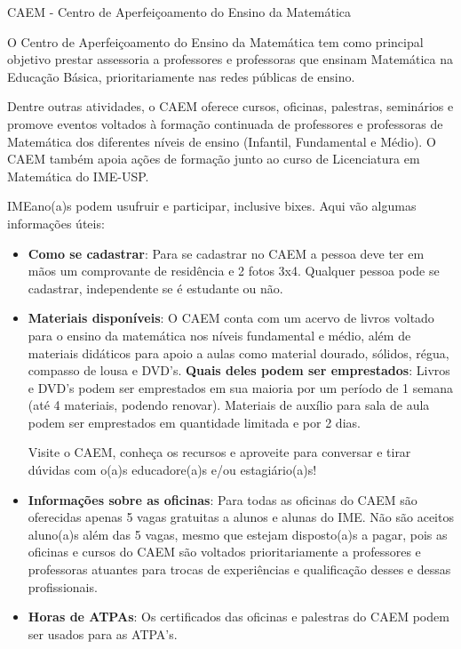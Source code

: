 \begin{secao}{CAEM - Centro de Aperfeiçoamento do Ensino da Matemática}

O Centro de Aperfeiçoamento do Ensino da Matemática tem como principal
objetivo prestar assessoria a professores e professoras que ensinam
Matemática na Educação Básica, prioritariamente nas redes públicas de
ensino.

Dentre outras atividades, o CAEM oferece cursos, oficinas, palestras,
seminários e promove eventos voltados à formação continuada de
professores e professoras de Matemática dos diferentes níveis de ensino
(Infantil, Fundamental e Médio). O CAEM também apoia ações de formação
junto ao curso de Licenciatura em Matemática do IME-USP.

IMEano(a)s podem usufruir e participar, inclusive bixes. Aqui vão algumas
informações úteis:

\begin{itemize}

\item \textbf{Como se cadastrar}: Para se cadastrar no CAEM a pessoa
  deve ter em mãos um comprovante de residência e 2 fotos
  3x4. Qualquer pessoa pode se cadastrar, independente se é estudante ou
  não.

\item \textbf{Materiais disponíveis}: O CAEM conta com um acervo de livros
  voltado para o ensino da matemática nos níveis fundamental e médio,
  além de materiais didáticos para apoio a aulas como material dourado,
  sólidos, régua, compasso de lousa e DVD's. \textbf{Quais deles podem
    ser emprestados}: Livros e DVD's podem ser emprestados em sua
  maioria por um período de 1 semana (até 4 materiais, podendo
  renovar). Materiais de auxílio para sala de aula podem ser emprestados em
  quantidade limitada e por 2 dias. 
  
  Visite o CAEM, conheça os recursos e aproveite para conversar e
  tirar dúvidas com o(a)s educadore(a)s e/ou estagiário(a)s!   

\item \textbf{Informações sobre as oficinas}: Para todas as oficinas
  do CAEM são oferecidas apenas 5 vagas gratuitas a alunos e alunas do IME. Não
  são aceitos aluno(a)s além das 5 vagas, mesmo que estejam disposto(a)s a
  pagar, pois as oficinas e cursos do CAEM são voltados prioritariamente a
  professores e professoras atuantes para trocas de experiências e qualificação
  desses e dessas profissionais.

\item \textbf{Horas de ATPAs}: Os certificados das oficinas e palestras
 do CAEM podem ser usados para as ATPA's.


\end{itemize}
\end{secao}
